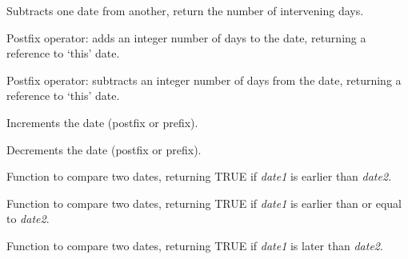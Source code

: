 Subtracts one date from another, return the number of intervening days.

\label{wxdateplusequals}


Postfix operator: adds an integer number of days to the date, returning
a reference to `this' date.

\label{wxdateminusequals}


Postfix operator: subtracts an integer number of days from the date, returning
a reference to `this' date.

\label{wxdateplusplus}


Increments the date (postfix or prefix).

\label{wxdateminusminus}


Decrements the date (postfix or prefix).

\label{wxdatelessthan}


Function to compare two dates, returning TRUE if {\it date1} is earlier than {\it date2}.

\label{wxdatelessthaneq}


Function to compare two dates, returning TRUE if {\it date1} is earlier than or equal to {\it date2}.

\label{wxdategreaterthan}


Function to compare two dates, returning TRUE if {\it date1} is later than {\it date2}.

\label{wxdategreaterthaneq}


